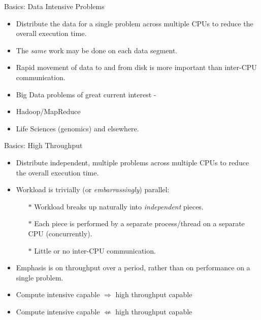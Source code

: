 \begin{frame}{Basics: Data Intensive Problems}
\begin{itemize}
\item{Distribute the \alert{data} for a \alert{single problem} across multiple CPUs to reduce the overall execution time.}
\pause
\item{The \emph{same} work may be done on each data segment.}
\pause
\item{Rapid movement of data to and from disk is more important than inter-CPU communication.}
\pause
\item{\alert{Big Data} problems of great current interest -}
\item{Hadoop/MapReduce}
\item{Life Sciences (genomics) and elsewhere.}
\end{itemize}
\end{frame}

\begin{frame}{Basics: High Throughput}
\begin{itemize}
\item{Distribute \alert{independent}, \alert{multiple problems} across multiple CPUs to reduce the overall execution time.}
\pause
\item{Workload is trivially (or \emph{embarrassingly}) parallel:}
\begin{itemize}
\item[$\ast$]{Workload breaks up naturally into \emph{independent} pieces.}
\item[$\ast$]{Each piece is performed by a separate process/thread on a separate CPU (concurrently).}
\item[$\ast$]{\alert{Little or no inter-CPU communication}.}
\end{itemize}
\pause
\item{Emphasis is on throughput over a period, rather than on performance on a single problem.}
\pause
\item{Compute intensive capable $\Rightarrow$ high throughput capable}
\pause
\item{\color{red}Compute intensive capable $\not\Leftarrow$ high throughput capable} 
\end{itemize}
\end{frame}


